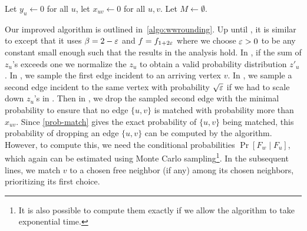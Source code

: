 \begin{algorithm}[h]
	\DontPrintSemicolon
	Let $y_u \gets 0$ for all $u$, let $x_{uv} \gets 0$ for all $u, v$. \;
	Let $M \gets \emptyset$. \;
\end{algorithm}

Our improved algorithm is outlined in~\cref{algo:wwrounding}. Up until , it is 
similar to  except that it uses $\beta = 2 - \varepsilon$ and $f = f_{1 + 2\varepsilon}$ where
we choose $\varepsilon > 0$ to be any constant small enough such that the results in the analysis hold.
In , if the
sum of $z_u$'s exceeds one we normalize the $z_u$ to obtain a valid probability distribution $z'_u$.
In , we sample the first edge incident to an arriving vertex $v$.
In , we sample a second edge incident to the same vertex with probability $\sqrt{\varepsilon}$ 
if we had to scale down $z_u$'s in .
Then in , we drop the sampled second edge with the minimal probability
to ensure that no edge $\{u, v\}$ is matched with probability more than $x_{uv}$. 
Since \eqref{prob-match} gives the exact probability of $\{u, v\}$ being matched, this probability of 
dropping an edge $\{u, v\}$ can be computed by the algorithm.
However, to compute this, we need the conditional probabilities $\Pr[F_w \mid F_u]$, which again
can be estimated using Monte Carlo sampling\footnote{It is also possible to compute them exactly if we 
allow the algorithm to take exponential time.}.
In the subsequent lines, we match $v$ to a chosen free neighbor (if any) among its chosen neighbors, 
prioritizing its first choice.


